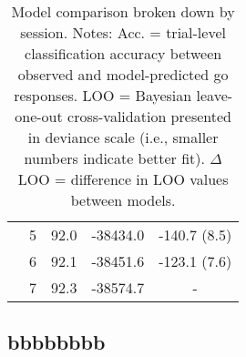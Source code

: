 \documentclass[a4paper,12pt]{article}
\begin{document}
\begin{refsection}[supp]
\begin{table}[h!]
\begin{tabular}{lcccr}
         & 5 & 92.0 & -38434.0 & -140.7 (8.5) \\
         & 6 & 92.1 & -38451.6 & -123.1 (7.6) \\
         & 7 & 92.3 & -38574.7 & \multicolumn{1}{c}{-} \\
         \bottomrule
    \end{tabular}
    \caption{Model comparison broken down by session. Notes: Acc. = trial-level classification accuracy between observed and model-predicted go responses. LOO = Bayesian leave-one-out cross-validation presented in deviance scale (i.e., smaller numbers indicate better fit). $\Delta$ LOO = difference in LOO values between models.}
    \label{tab:exp1_mc_full}
\end{table}

\clearpage
\subsection*{bbbbbbbb}


\end{refsection}
\end{document}
